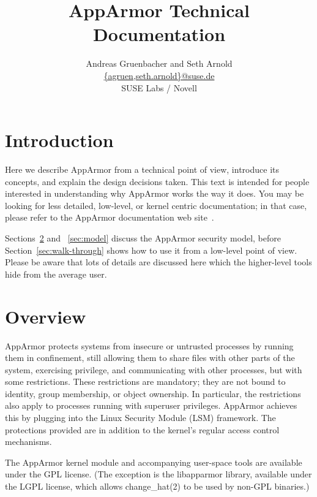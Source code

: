 \documentclass[a4paper]{article}
\title{AppArmor Technical Documentation}
\author{Andreas Gruenbacher and Seth Arnold \\
\url{{agruen,seth.arnold}@suse.de} \\
SUSE Labs / Novell}
\begin{document}
\maketitle

\tableofcontents

\newpage


\section{Introduction}

Here we describe AppArmor from a technical point of view, introduce its
concepts, and explain the design decisions taken.  This text is intended
for people interested in understanding why AppArmor works the way it
does.  You may be looking for less detailed, low-level, or kernel
centric documentation; in that case, please refer to the AppArmor
documentation web site~\cite{apparmor}.

Sections~\ref{sec:overview} and ~\ref{sec:model} discuss the AppArmor
security model, before Section~\ref{sec:walk-through} shows how to use
it from a low-level point of view.  Please be aware that lots of details
are discussed here which the higher-level tools hide from the average
user.


\section{Overview}
\label{sec:overview}

AppArmor protects systems from insecure or untrusted processes by
running them in confinement, still allowing them to share files with
other parts of the system, exercising privilege, and communicating with
other processes, but with some restrictions.  These restrictions are
mandatory; they are not bound to identity, group membership, or object
ownership.  In particular, the restrictions also apply to processes
running with superuser privileges.  AppArmor achieves this by plugging
into the Linux Security Module (LSM) framework.  The protections
provided are in addition to the kernel's regular access control
mechanisms.

The AppArmor kernel module and accompanying user-space tools are
available under the GPL license. (The exception is the libapparmor
library, available under the LGPL license, which allows change\_hat(2)
to be used by non-GPL binaries.)
\end{document}
